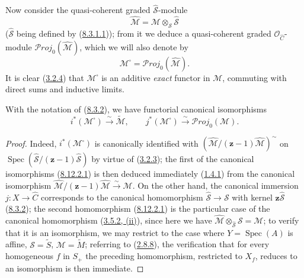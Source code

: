 \begin{env}[8.12.1]
Now consider the quasi-coherent graded
$\widehat{\mathcal{S}}$-module
\begin{equation}
\label{II.8.12.1.4}
  \widehat{\mathcal{M}}
  =\mathcal{M}\otimes_{\mathcal{S}}\widehat{\mathcal{S}}
\tag{8.12.1.4}
\end{equation}
($\widehat{\mathcal{S}}$ being defined by
(\hyperref[II.8.3.1.1]{8.3.1.1})); from it we deduce a quasi-coherent
graded $\mathcal{O}_{\widehat{C}}$-module
$\mathcal{P}\mathit{roj}_0(\widehat{\mathcal{M}})$, which we will also denote by
\begin{equation}
\label{II.8.12.1.5}
  \mathcal{M}^{\square}=\mathcal{P}\mathit{roj}_0(\widehat{\mathcal{M}}).
\tag{8.12.1.5}
\end{equation}
It is clear (\hyperref[II.3.2.4]{3.2.4}) that
$\mathcal{M}^{\square}$ is an additive \emph{exact} functor in $\mathcal{M}$,
commuting with direct sums and inductive limits.
\end{env}

\begin{proposition}[8.12.2]
\label{II.8.12.2}
With the notation of \textup{(\hyperref[II.8.3.2]{8.3.2})}, we have functorial
canonical isomorphisms
\begin{equation}
\label{II.8.12.2.1}
  i^*(\mathcal{M}^{\square})\xrightarrow{\sim}\widetilde{\mathcal{M}},
  \qquad
  j^*(\mathcal{M}^{\square})\xrightarrow{\sim}
  \mathcal{P}\mathit{roj}_0(\mathcal{M}).
\tag{8.12.2.1}
\end{equation}
\end{proposition}

\begin{proof}
Indeed, $i^*(\mathcal{M}^{\square})$ is canonically identified with
$\left(\widehat{\mathcal{M}}/(\mathbf{z}-1)\widehat{\mathcal{M}}\right)^{\sim}$
on
$\operatorname{Spec}(\widehat{\mathcal{S}}/(\mathbf{z}-1)\widehat{\mathcal{S}})$
by virtue of (\hyperref[II.3.2.3]{3.2.3}); the first of the canonical
isomorphisms (\hyperref[II.8.12.2.1]{8.12.2.1}) is then deduced immediately
(\hyperref[II.1.4.1]{1.4.1}) from the canonical isomorphism
$\widehat{\mathcal{M}}/(\mathbf{z}-1)\widehat{\mathcal{M}}
\xrightarrow{\sim}\mathcal{M}$. On the other hand, the canonical immersion
$j:X\to\widehat{C}$ corresponds to the canonical homomorphism
$\widehat{\mathcal{S}}\to\mathcal{S}$ with kernel
$\mathbf{z}\widehat{\mathcal{S}}$ (\hyperref[II.8.3.2]{8.3.2}); the second
homomorphism (\hyperref[II.8.12.2.1]{8.12.2.1}) is the particular case
of the canonical homomorphism (\hyperref[II.3.5.2]{3.5.2, (ii)}), since
here we have
$\widehat{\mathcal{M}}\otimes_{\widehat{\mathcal{S}}}\mathcal{S}
=\mathcal{M}$; to verify that it is an isomorphism, we may restrict to the
case where $Y=\operatorname{Spec}(A)$ is affine,
$\mathcal{S}=\widetilde{S}$, $\mathcal{M}=\widetilde{M}$; referring to
(\hyperref[II.2.8.8]{2.8.8}), the verification that for every homogeneous
$f$ in $S_+$ the preceding homomorphism, restricted to $X_f$, reduces to an
isomorphism is then immediate.
\end{proof}

